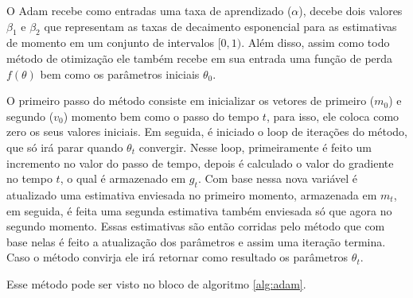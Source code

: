 O Adam recebe como entradas uma taxa de aprendizado ($\alpha$), decebe dois valores $\beta_1$ e $\beta_2$ que representam as taxas de decaimento esponencial para as estimativas de momento em um conjunto de intervalos $[0, 1)$. Além disso, assim como todo método de otimização ele também recebe em sua entrada uma função de perda $f(\theta)$ bem como os parâmetros iniciais $\theta_0$.

O primeiro passo do método consiste em inicializar os vetores de primeiro ($m_0$) e segundo ($v_0$) momento bem como o passo do tempo $t$, para isso, ele coloca como zero os seus valores iniciais. Em seguida, é iniciado o loop de iterações do método, que só irá parar quando $\theta_t$ convergir. Nesse loop, primeiramente é feito um incremento no valor do passo de tempo, depois é calculado o valor do gradiente no tempo $t$, o qual é armazenado em $g_t$. Com base nessa nova variável é atualizado uma estimativa enviesada no primeiro momento, armazenada em $m_t$, em seguida, é feita uma segunda estimativa também enviesada só que agora no segundo momento. Essas estimativas são então corridas pelo método que com base nelas é feito a atualização dos parâmetros e assim uma iteração termina. Caso o método convirja ele irá retornar como resultado os parâmetros $\theta_t$.

Esse método pode ser visto no bloco de algoritmo \ref{alg:adam}.

